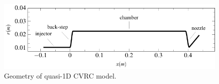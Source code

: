 \begin{figure}
\centering
        \includegraphics[scale=1]{Figures/paper-figure24.pdf}
\caption{Geometry of quasi-1D CVRC model.}
\label{fig:radius}
\end{figure}

